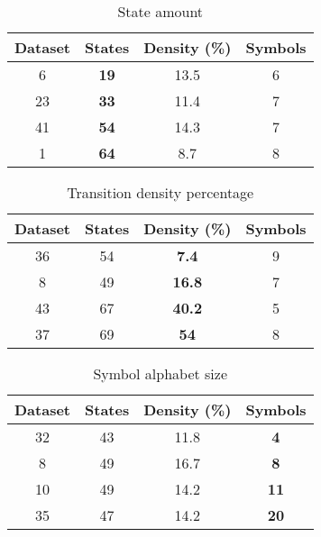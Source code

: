 \FloatBarrier

\begin{table}
\centering
{
\begin{tabular}{| c | c | c | c |}
  \hline
  Dataset 	& \textbf{States} 	& Density (\%) 	& Symbols \\  \hline
  6 			& \textbf{19 }			&	13.5				& 6 \\
  23 			& \textbf{33} 			&	11.4				& 7 \\
  41			& \textbf{54} 			&	14.3				& 7 \\
  1				& \textbf{64} 			&	8.7				& 8 \\ \hline
\end{tabular}
\caption{State amount}
\label{state_table}
}
\end{table}

\begin{table}
\centering
{
\begin{tabular}{| c | c | c | c |}
  \hline
  Dataset 	& States  			& \textbf{Density (\%)} 		& Symbols \\  \hline
  36 			&	54					& \textbf{7.4 }						& 9 \\
  8 			&	49					& \textbf{16.8 }					& 7 \\
  43			&	67					& \textbf{40.2 }					& 5 \\
  37			&	69					& \textbf{54 	}					& 8 \\ \hline
\end{tabular}
\caption{Transition density percentage}
\label{density_table}
}
\end{table}

\begin{table}
\centering
{
\begin{tabular}{| c | c | c | c |}
  \hline
  Dataset 	& States	 	& Density (\%) 	& \textbf{Symbols}	 \\  \hline
  32 			& 43				& 11.8				& \textbf{4}		\\
  8 			& 49				& 16.7 				& \textbf{8}		\\
  10			& 49				& 14.2 				& \textbf{11}	\\
  35			& 47				& 14.2 				& \textbf{20}	\\ \hline
\end{tabular}
\caption{Symbol alphabet size}
\label{symbol_table}

}
\end{table}